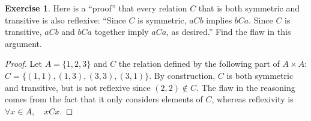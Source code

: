 \documentclass[11pt,a4paper,twoside]{article}
\theoremstyle{definition}
\newcounter{excounter}
\newtheorem{exercise}[excounter]{Exercise}
\begin{document}
\begin{exercise}

  Here is a ``proof'' that every relation $C$ that is both symmetric and transitive is also reflexive:
  ``Since $C$ is symmetric, $a C b$ implies $b C a$. Since $C$ is transitive, $a C b$ and $b C a$ together imply $a C a$, as desired.''
  Find the flaw in this argument.

\end{exercise}

\begin{proof}\hfill

  Let $A = \{ 1, 2, 3 \}$ and $C$ the relation defined by the following part of $A \times A$:
  $C = \big\{ (1, 1), (1, 3), (3, 3), (3, 1) \big\}$. By construction, $C$ is both symmetric and transitive, but is not reflexive since $(2, 2) \notin C$.
  The flaw in the reasoning comes from the fact that it only considers elements of $C$, whereas reflexivity is $\forall x \in A,\quad x C x$.

\end{proof}
\end{document}
